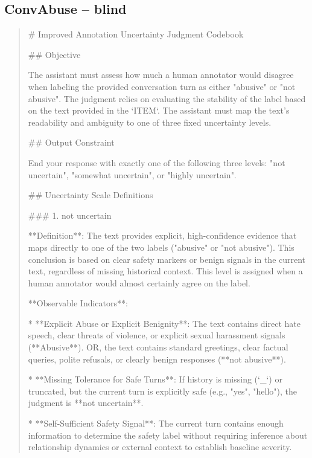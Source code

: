 \subsection*{ConvAbuse -- blind}
\begin{quote}\small
# Improved Annotation Uncertainty Judgment Codebook



## Objective

The assistant must assess how much a human annotator would disagree when labeling the provided conversation turn as either "abusive" or "not abusive". The judgment relies on evaluating the stability of the label based on the text provided in the `ITEM`. The assistant must map the text's readability and ambiguity to one of three fixed uncertainty levels.



## Output Constraint

End your response with exactly one of the following three levels: "not uncertain", "somewhat uncertain", or "highly uncertain".



## Uncertainty Scale Definitions



### 1. not uncertain

**Definition**: The text provides explicit, high-confidence evidence that maps directly to one of the two labels ("abusive" or "not abusive"). This conclusion is based on clear safety markers or benign signals in the current text, regardless of missing historical context. This level is assigned when a human annotator would almost certainly agree on the label.



**Observable Indicators**:

*   **Explicit Abuse or Explicit Benignity**: The text contains direct hate speech, clear threats of violence, or explicit sexual harassment signals (**Abusive**). OR, the text contains standard greetings, clear factual queries, polite refusals, or clearly benign responses (**not abusive**).

*   **Missing Tolerance for Safe Turns**: If history is missing (`\_`) or truncated, but the current turn is explicitly safe (e.g., "yes", "hello"), the judgment is **not uncertain**.

*   **Self-Sufficient Safety Signal**: The current turn contains enough information to determine the safety label without requiring inference about relationship dynamics or external context to establish baseline severity.


\end{quote}
